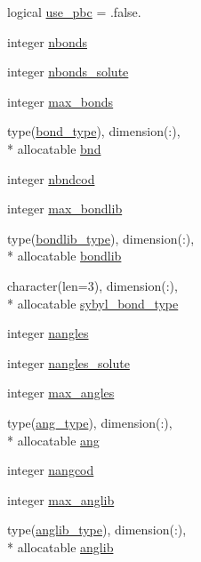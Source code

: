 \begin{DoxyCompactItemize}
\item 
logical \hyperlink{classtopo_aa8f6e5af5947f84992ab2b021b47bc7b}{use\-\_\-pbc} = .false.
\item 
integer \hyperlink{classtopo_a4f77c74b9498ed0ab1e72a2f82c1796f}{nbonds}
\item 
integer \hyperlink{classtopo_a827a5b6a9b9047edf57a7a0c4d1c3ed8}{nbonds\-\_\-solute}
\item 
integer \hyperlink{classtopo_a40ede124fdad99eb520cd35353772625}{max\-\_\-bonds}
\item 
type(\hyperlink{structtopo_1_1bond__type}{bond\-\_\-type}), dimension(\-:), \\*
allocatable \hyperlink{classtopo_ae81427ee7513e74fcb1520cdc0523e56}{bnd}
\item 
integer \hyperlink{classtopo_a87c426cfe207ece52a6f31615499f98e}{nbndcod}
\item 
integer \hyperlink{classtopo_adba79e0b7b7a62d7222fd453ec63aeb6}{max\-\_\-bondlib}
\item 
type(\hyperlink{structtopo_1_1bondlib__type}{bondlib\-\_\-type}), dimension(\-:), \\*
allocatable \hyperlink{classtopo_af8d6aa1609b783f42bbac18b0cf8ae54}{bondlib}
\item 
character(len=3), dimension(\-:), \\*
allocatable \hyperlink{classtopo_a0bd8eb8a9acd81024eda5ce4abbec08e}{sybyl\-\_\-bond\-\_\-type}
\item 
integer \hyperlink{classtopo_acb9de4b76e3e1615bb6f05ca40c22c61}{nangles}
\item 
integer \hyperlink{classtopo_a9095694ab9db269f2ee2508062eee9bd}{nangles\-\_\-solute}
\item 
integer \hyperlink{classtopo_a132cc719eeaf3f1f29ce8417010fb4b6}{max\-\_\-angles}
\item 
type(\hyperlink{structtopo_1_1ang__type}{ang\-\_\-type}), dimension(\-:), \\*
allocatable \hyperlink{classtopo_a56261b466e299c202f2e574284fbe9c4}{ang}
\item 
integer \hyperlink{classtopo_a436580317d68710fbbcccd1ee7440194}{nangcod}
\item 
integer \hyperlink{classtopo_af2e022280b5f0e4ca0ccad0bc6f08a64}{max\-\_\-anglib}
\item 
type(\hyperlink{structtopo_1_1anglib__type}{anglib\-\_\-type}), dimension(\-:), \\*
allocatable \hyperlink{classtopo_a4eca44c180379aa76933b665a911feec}{anglib}
\item 

\end{DoxyCompactItemize}
